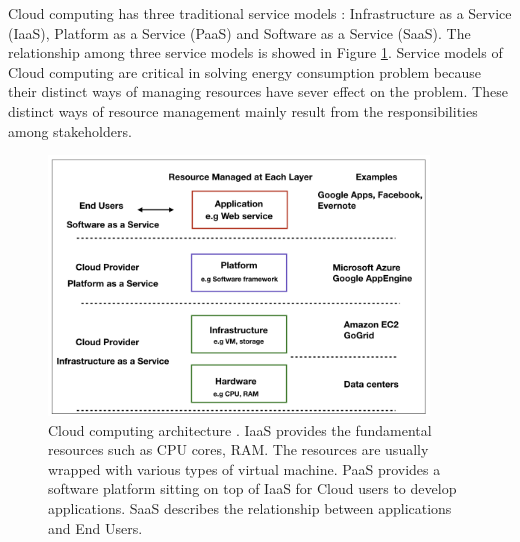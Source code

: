 Cloud computing has three traditional service models \cite{Mell:2011jj}: Infrastructure as a Service (IaaS), Platform as a Service (PaaS) and Software as a Service (SaaS). The relationship among three service models is showed in Figure \ref{fig:architecture}. 
Service models of Cloud computing are critical in solving energy consumption problem because their distinct ways of managing resources have sever effect on the problem. These distinct ways of resource management mainly result from the responsibilities among stakeholders. 

\begin{figure}
	\centering
	\includegraphics[width=0.9\textwidth]{pics/architecture.png}
	\caption{Cloud computing architecture \cite{Zhang:2010vo}. 
	IaaS provides the fundamental resources such as CPU cores, RAM. The resources are usually wrapped with various types of virtual machine. PaaS provides a software platform sitting on top of IaaS for Cloud users to develop applications. SaaS describes the relationship between applications and End Users.}
	\label{fig:architecture}
\end{figure} 

